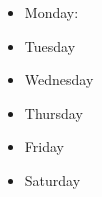 \begin{itemize}
          \tiny \item \tiny Monday: 
        \item \tiny Tuesday
        \item \tiny Wednesday
        \item \tiny Thursday
        \item \tiny Friday
        \item \tiny Saturday
        \end{itemize} 

